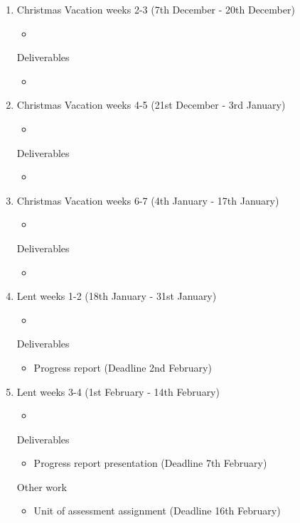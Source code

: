 \documentclass[12pt,a4paper]{article}
\begin{document}
\begin{enumerate}
    \item Christmas Vacation weeks 2-3 (7th December - 20th December)
    \begin{itemize}
        \item 
    \end{itemize}
    Deliverables
    \begin{itemize}
        \item 
    \end{itemize}

    \item Christmas Vacation weeks 4-5 (21st December - 3rd January)
    \begin{itemize}
        \item 
    \end{itemize}
    Deliverables
    \begin{itemize}
        \item 
    \end{itemize}

    \item Christmas Vacation weeks 6-7 (4th January - 17th January)
    \begin{itemize}
        \item 
    \end{itemize}
    Deliverables
    \begin{itemize}
        \item 
    \end{itemize}

    \item Lent weeks 1-2 (18th January - 31st January)
    \begin{itemize}
        \item 
    \end{itemize}
    Deliverables
    \begin{itemize}
        \item Progress report (Deadline 2nd February)
    \end{itemize}

    \item Lent weeks 3-4 (1st February - 14th February)
    \begin{itemize}
        \item 
    \end{itemize}
    Deliverables
    \begin{itemize}
        \item Progress report presentation (Deadline 7th February)
    \end{itemize}
    Other work
    \begin{itemize}
        \item Unit of assessment assignment (Deadline 16th February)
    \end{itemize}


\end{enumerate}
\end{document}
